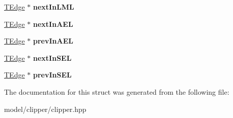 \begin{DoxyCompactItemize}
\item 
\hypertarget{structClipperLib_1_1TEdge_af9f1d12d9a024e0aeb0a5810e66a343d}{\hyperlink{structClipperLib_1_1TEdge}{T\-Edge} $\ast$ {\bfseries next\-In\-L\-M\-L}}\label{structClipperLib_1_1TEdge_af9f1d12d9a024e0aeb0a5810e66a343d}

\item 
\hypertarget{structClipperLib_1_1TEdge_a2e4f5e8ffce918c2d5cf260252a4e811}{\hyperlink{structClipperLib_1_1TEdge}{T\-Edge} $\ast$ {\bfseries next\-In\-A\-E\-L}}\label{structClipperLib_1_1TEdge_a2e4f5e8ffce918c2d5cf260252a4e811}

\item 
\hypertarget{structClipperLib_1_1TEdge_a0da02ede8e83c3a4b27a09ebde1dfcf3}{\hyperlink{structClipperLib_1_1TEdge}{T\-Edge} $\ast$ {\bfseries prev\-In\-A\-E\-L}}\label{structClipperLib_1_1TEdge_a0da02ede8e83c3a4b27a09ebde1dfcf3}

\item 
\hypertarget{structClipperLib_1_1TEdge_aa98ac28e25e2a0bf4001ca9547ea0ae8}{\hyperlink{structClipperLib_1_1TEdge}{T\-Edge} $\ast$ {\bfseries next\-In\-S\-E\-L}}\label{structClipperLib_1_1TEdge_aa98ac28e25e2a0bf4001ca9547ea0ae8}

\item 
\hypertarget{structClipperLib_1_1TEdge_aead630eae0633921989272f74d7d169b}{\hyperlink{structClipperLib_1_1TEdge}{T\-Edge} $\ast$ {\bfseries prev\-In\-S\-E\-L}}\label{structClipperLib_1_1TEdge_aead630eae0633921989272f74d7d169b}

\end{DoxyCompactItemize}


The documentation for this struct was generated from the following file\-:\begin{DoxyCompactItemize}
\item 
model/clipper/clipper.\-hpp\end{DoxyCompactItemize}
